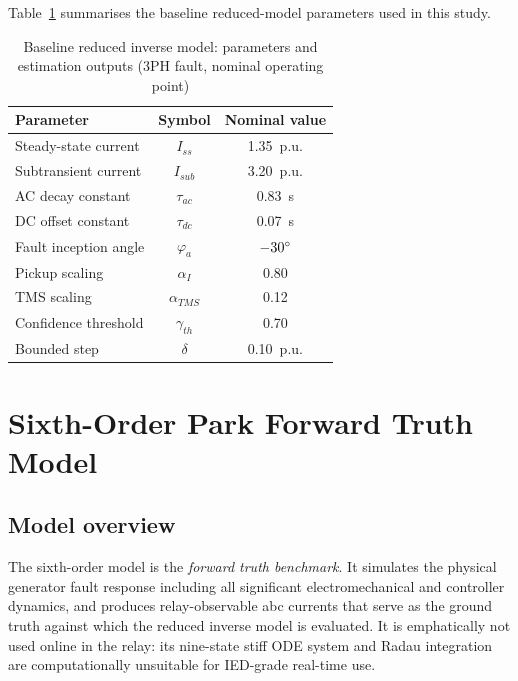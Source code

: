 \documentclass[journal,twoside,letterpaper]{IEEEtran}
\begin{document}
Table~\ref{tab:baseline_params} summarises the baseline
reduced-model parameters used in this study.

\begin{table}[!t]
\caption{Baseline reduced inverse model: parameters and
         estimation outputs (3PH fault, nominal operating point)}
\label{tab:baseline_params}
\centering
\renewcommand{\arraystretch}{1.15}
\begin{tabular}{lcc}
\toprule
Parameter & Symbol & Nominal value \\
\midrule
Steady-state current      & $I_{ss}$      & 1.35~p.u. \\
Subtransient current      & $I_{sub}$     & 3.20~p.u. \\
AC decay constant         & $\tau_{ac}$   & 0.83~s \\
DC offset constant        & $\tau_{dc}$   & 0.07~s \\
Fault inception angle     & $\varphi_a$   & $-30\degree$ \\
Pickup scaling            & $\alpha_I$    & 0.80 \\
TMS scaling               & $\alpha_{TMS}$& 0.12 \\
Confidence threshold      & $\gamma_{th}$ & 0.70 \\
Bounded step              & $\delta$      & 0.10~p.u. \\
\bottomrule
\end{tabular}
\end{table}

\section{Sixth-Order Park  Forward Truth Model}
\label{sec:sixthorder}

\subsection{Model overview}

The sixth-order model is the \emph{forward truth benchmark}.
It simulates the physical generator fault response including
all significant electromechanical and controller dynamics,
and produces relay-observable abc currents that serve as the
ground truth against which the reduced inverse model is
evaluated.
It is emphatically not used online in the relay: its
nine-state stiff ODE system and Radau integration are
computationally unsuitable for IED-grade real-time use.
\end{document}
